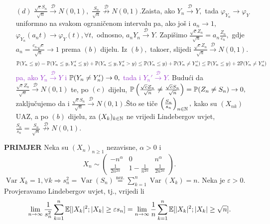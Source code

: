 \documentclass{article}
\newcommand{\Var}{\operatorname{Var}}
\begin{document}
\begin{enumerate}
    \item[\((d)\)] \(\frac{\sqrt cS_n}{\sqrt n}\overset{\mathcal D}{\longrightarrow}N(0,1),\) \(\frac{S_n}{\sqrt n}\overset{\mathcal D}{\not\longrightarrow}N(0,1).\)\newline Zaista, ako \(Y_n\overset{\mathcal D}{\longrightarrow}Y,\) tada \(\varphi_{Y_n}\to\varphi_Y\) uniformno na svakom ograničenom intervalu pa, ako još i \(a_n\to 1,\) \(\varphi_{Y_n}(a_nt)\to\varphi_Y(t),\forall t,\) odnosno, \(a_nY_n\overset{\mathcal D}{\longrightarrow}Y.\) Zapišimo \(\frac{\sqrt cZ_n}{\sqrt n}=a_n\frac{Z_n}{c_n},\) gdje \(a_n=\frac{c_n\sqrt c}{\sqrt n}\to 1\) prema \((b)\) dijelu. Iz \((b),\) tako\dj{}er, slijedi \(\frac{\sqrt cZ_n}{\sqrt n}\overset{\mathcal D}{\longrightarrow}N(0,1).\) \textcolor{DarkOrchid}{\[\Bbb P(Y_n\le y)=\Bbb P(Y_n\le y,Y_n'\le y)+\Bbb P(Y_n\le y,Y_n'>y)\le\Bbb P(Y_n\le y)+\Bbb P(Y_n\ne Y_n')\le\Bbb P(Y_n\le y)+2\Bbb P(Y_n\ne Y_n')\] pa, ako \(Y_n\overset{\mathcal D}{\longrightarrow}Y\) i \(\Bbb P(Y_n\ne Y_n')\to 0,\) tada i \(Y_n'\overset{\mathcal D}{\longrightarrow}Y.\)} Budući da \(\frac{\sqrt cZ_n}{\sqrt n}\overset{\mathcal D}{\longrightarrow}N(0,1)\) te, po \((c)\) dijelu, \(\Bbb P\left(\frac{\sqrt cZ_n}{\sqrt n}\ne\frac{\sqrt cS_n}{\sqrt n}\right)=\Bbb P(Z_n\ne S_n)\to 0,\) zaključujemo da i \(\frac{\sqrt cS_n}{\sqrt n}\overset{\mathcal D}{\longrightarrow}N(0,1).\)\newline Što se tiče \(\left(\frac{S_n}{s_n}\right)_{n\in\Bbb N},\) kako su \((X_{nk})\) UAZ, a po \((b)\) dijelu, za \((X_k)_{k\in\Bbb N}\) ne vrijedi Lindebergov uvjet, \(\frac{S_n}{s_n}=\frac{S_n}{\sqrt n}\overset{\mathcal D}{\not\longrightarrow}N(0,1).\) 
\end{enumerate}
\textbf{PRIMJER}\newline
Neka su \((X_n)_{n\ge1}\) nezavisne, \(\alpha>0\) i \[X_n\sim\begin{pmatrix}-n^\alpha&0&n^\alpha\\\frac1{2n^{2\alpha}}&1-\frac1{n^{2\alpha}}&\frac1{2n^{2\alpha}}\end{pmatrix}.\] \(\Var X_k=1,\forall k\Rightarrow s_n^2=\Var(S_n)\overset{\text{nez.}}{=}\sum_{k=1}^n\Var(X_k)=n.\) Neka je \(\varepsilon>0.\) Provjeravamo Lindebergov uvjet, tj., vrijedi li \[\lim_{n\to\infty}\frac1{s_n^2}\sum_{k=1}^n\Bbb E[|X_k|^2;|X_k|\ge\varepsilon s_n]=\lim_{n\to\infty}\frac1n\sum_{k=1}^n\Bbb E[|X_k|^2;|X_k|\ge\sqrt n].\]
\end{document}
